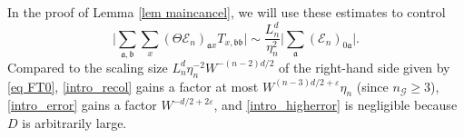 \documentclass{article}
\newcommand{\1}{\mathds{1}}
\numberwithin{equation}{section}
\newcommand{\be}{\begin{equation}}
\newcommand{\ee}{\end{equation}}
\newcommand{\e}{{\varepsilon}}
\newcommand{\fa}{{\mathfrak a}}
\newcommand{\fb}{{\mathfrak b}}
\renewcommand{\cal}{\mathcal}
\newcommand{\ii}{\mathrm{i}} %
\renewcommand{\leq}{\leqslant}
\renewcommand{\geq}{\geqslant}
\renewcommand{\le}{\leq}
\renewcommand{\ge}{\geq}
\theoremstyle{plain} %
\newtheorem{theorem}{Theorem}[section]
\theoremstyle{remark}
\newcommand{\Sele}{{\mathcal E}}
\begin{document}
In the proof of Lemma \ref{lem maincancel}, we will use these estimates to control
$$ 
\Big| \sum_{\fa,\fb}\sum_x \left(\Theta \Sele_n\right)_{\fa x} T_{x,\fb\fb}\Big| \sim \frac{L_n^{d}}{\eta_n^2} \Big| \sum_{\fa} (\Sele_n)_{0\fa } \Big| .$$
Compared to the scaling size $L_n^d \eta_n^{-2} W^{-(n -2)d/2}$ of the right-hand side  given by \eqref{eq FT0}, \eqref{intro_recol} gains a factor at most $W^{(n-3)d/2+\e}\eta_n$ (since $n_{\cal G}\ge 3$), \eqref{intro_error} gains a factor $W^{-d/2+2\e}$, and \eqref{intro_higherror} is negligible because $D$ is arbitrarily large.

%
%

\end{document}
